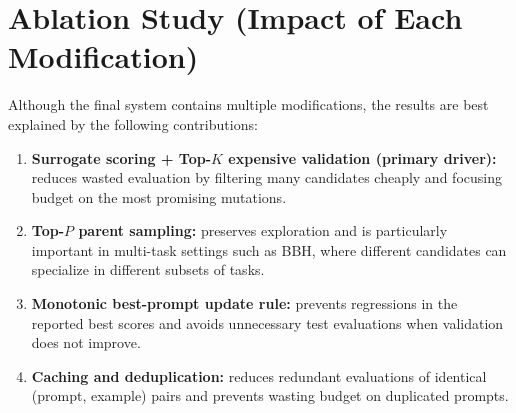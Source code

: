 \begin{table}[H]
\centering
\small
\caption{Comparison between Original GEPA and Ours (\textit{SciEval}).}
\label{tab:scieval}
\end{table}

\section{Ablation Study (Impact of Each Modification)}
Although the final system contains multiple modifications, the results are best explained by the following contributions:
\begin{enumerate}
    \item \textbf{Surrogate scoring + Top-$K$ expensive validation (primary driver):} reduces wasted evaluation by filtering many candidates cheaply and focusing budget on the most promising mutations.
    \item \textbf{Top-$P$ parent sampling:} preserves exploration and is particularly important in multi-task settings such as BBH, where different candidates can specialize in different subsets of tasks.
    \item \textbf{Monotonic best-prompt update rule:} prevents regressions in the reported best scores and avoids unnecessary test evaluations when validation does not improve.
    \item \textbf{Caching and deduplication:} reduces redundant evaluations of identical (prompt, example) pairs and prevents wasting budget on duplicated prompts.
\end{enumerate}

